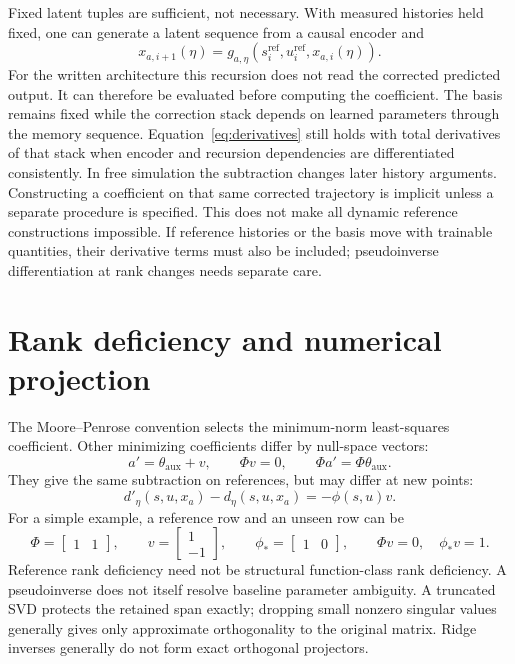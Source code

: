 \documentclass[11pt,a4paper]{article}
\newcommand{\refset}{\mathrm{ref}}
\begin{document}
Fixed latent tuples are sufficient, not necessary. With measured histories held fixed, one can generate a latent sequence from a causal encoder and
\begin{equation}\label{eq:measuredlatent}
x_{a,i+1}(\eta)=g_{a,\eta}(s_i^{\refset},u_i^{\refset},x_{a,i}(\eta)).
\end{equation}
For the written architecture this recursion does not read the corrected predicted output. It can therefore be evaluated before computing the coefficient. The basis remains fixed while the correction stack depends on learned parameters through the memory sequence. Equation~\eqref{eq:derivatives} still holds with total derivatives of that stack when encoder and recursion dependencies are differentiated consistently.
In free simulation the subtraction changes later history arguments. Constructing a coefficient on that same corrected trajectory is implicit unless a separate procedure is specified. This does not make all dynamic reference constructions impossible. If reference histories or the basis move with trainable quantities, their derivative terms must also be included; pseudoinverse differentiation at rank changes needs separate care.

\section{Rank deficiency and numerical projection}
The Moore--Penrose convention selects the minimum-norm least-squares coefficient. Other minimizing coefficients differ by null-space vectors:
\begin{equation}\label{eq:nullspace}
a'=\theta_{\mathrm{aux}}+v,\qquad \Phi v=0,\qquad \Phi a'=\Phi \theta_{\mathrm{aux}}.
\end{equation}
They give the same subtraction on references, but may differ at new points:
\begin{equation}\label{eq:extrapolation}
d'_\eta(s,u,x_a)-d_\eta(s,u,x_a)=-\phi(s,u)v.
\end{equation}
For a simple example, a reference row and an unseen row can be
\begin{equation}\label{eq:rankexample}
\Phi=\begin{bmatrix}1&1\end{bmatrix},\qquad v=\begin{bmatrix}1\\-1\end{bmatrix},
\qquad \phi_*=\begin{bmatrix}1&0\end{bmatrix},\qquad \Phi v=0,\quad\phi_*v=1.
\end{equation}
Reference rank deficiency need not be structural function-class rank deficiency. A pseudoinverse does not itself resolve baseline parameter ambiguity. A truncated SVD protects the retained span exactly; dropping small nonzero singular values generally gives only approximate orthogonality to the original matrix. Ridge inverses generally do not form exact orthogonal projectors.
\end{document}
